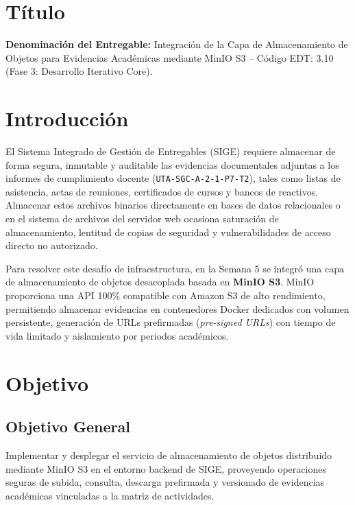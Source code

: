\documentclass[12pt,a4paper]{article}
\begin{document}

\vspace{0.25cm}
\section{Título}
\textbf{Denominación del Entregable:} Integración de la Capa de Almacenamiento de Objetos para Evidencias Académicas mediante MinIO S3 -- Código EDT: 3.10 (Fase 3: Desarrollo Iterativo Core).

\section{Introducción}
El Sistema Integrado de Gestión de Entregables (SIGE) requiere almacenar de forma segura, inmutable y auditable las evidencias documentales adjuntas a los informes de cumplimiento docente (\texttt{UTA-SGC-A-2-1-P7-T2}), tales como listas de asistencia, actas de reuniones, certificados de cursos y bancos de reactivos. Almacenar estos archivos binarios directamente en bases de datos relacionales o en el sistema de archivos del servidor web ocasiona saturación de almacenamiento, lentitud de copias de seguridad y vulnerabilidades de acceso directo no autorizado.

Para resolver este desafío de infraestructura, en la Semana 5 se integró una capa de almacenamiento de objetos desacoplada basada en \textbf{MinIO S3}. MinIO proporciona una API 100\% compatible con Amazon S3 de alto rendimiento, permitiendo almacenar evidencias en contenedores Docker dedicados con volumen persistente, generación de URLs prefirmadas (\textit{pre-signed URLs}) con tiempo de vida limitado y aislamiento por periodos académicos.

\section{Objetivo}

\subsection{Objetivo General}
Implementar y desplegar el servicio de almacenamiento de objetos distribuido mediante MinIO S3 en el entorno backend de SIGE, proveyendo operaciones seguras de subida, consulta, descarga prefirmada y versionado de evidencias académicas vinculadas a la matriz de actividades.
\end{document}
